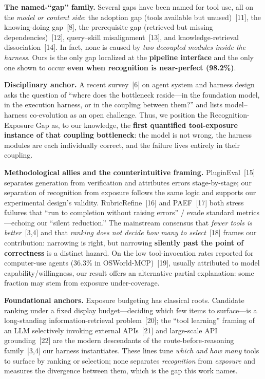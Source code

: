 \textbf{The named-``gap'' family.} Several gaps have been named for tool use, all on the \emph{model or content side}: the adoption gap (tools available but unused)~[11], the knowing-doing gap~[8], the prerequisite gap (retrieved but missing dependencies)~[12], query--skill misalignment~[13], and knowledge-retrieval dissociation~[14]. In fact, none is caused by \emph{two decoupled modules inside the harness}. Ours is the only gap localized at the \textbf{pipeline interface} and the only one shown to occur \textbf{even when recognition is near-perfect (98.2\%)}.

\textbf{Disciplinary anchor.} A recent survey~[6] on agent system and harness design asks the question of ``where does the bottleneck reside---in the foundation model, in the execution harness, or in the coupling between them?'' and lists model--harness co-evolution as an open challenge. Thus, we position the Recognition-Exposure Gap as, to our knowledge, the \textbf{first quantified tool-exposure instance of that coupling bottleneck}: the model is not wrong, the harness modules are each individually correct, and the failure lives entirely in their coupling.

\textbf{Methodological allies and the counterintuitive framing.} PluginEval~[15] separates generation from verification and attributes errors stage-by-stage; our separation of recognition from exposure follows the same logic and supports our experimental design's validity. RubricRefine~[16] and PAEF~[17] both stress failures that ``run to completion without raising errors'' / evade standard metrics---echoing our ``silent reduction.'' The mainstream consensus that \emph{fewer tools is better}~[3,4] and that \emph{ranking does not decide how many to select}~[18] frames our contribution: narrowing is right, but narrowing \textbf{silently past the point of correctness} is a distinct hazard. On the low tool-invocation rates reported for computer-use agents (36.3\% in OSWorld-MCP)~[19], usually attributed to model capability/willingness, our result offers an alternative partial explanation: some fraction may stem from exposure under-coverage.

\textbf{Foundational anchors.} Exposure budgeting has classical roots. Candidate ranking under a fixed display budget---deciding which few items to surface---is a long-standing information-retrieval problem~[20]; the ``tool learning'' framing of an LLM selectively invoking external APIs~[21] and large-scale API grounding~[22] are the modern descendants of the route-before-reasoning family~[3,4] our harness instantiates. These lines tune \emph{which and how many} tools to surface by ranking or selection; none separates \emph{recognition} from \emph{exposure} and measures the divergence between them, which is the gap this work names.

